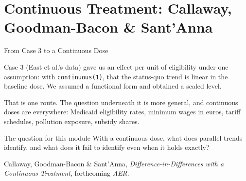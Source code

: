 \documentclass[main.tex]{subfiles}
\begin{document}
\section{Continuous Treatment: Callaway, Goodman-Bacon \& Sant'Anna}

\begin{frame}{From Case 3 to a Continuous Dose}

  Case 3 (East et al.'s data) gave us an effect per unit of eligibility under
  one assumption: with \texttt{continuous(1)}, that the status-quo trend is
  linear in the baseline dose. We assumed a functional form and obtained a
  scaled level.

  \medskip
  That is one route. The question underneath it is more general, and continuous
  doses are everywhere: Medicaid eligibility rates, minimum wages in euros,
  tariff schedules, pollution exposure, subsidy shares.

  \medskip
  \begin{block}{The question for this module}
    With a continuous dose, what does parallel trends identify, and what does it
    fail to identify even when it holds exactly?
  \end{block}

  \medskip
  \footnotesize Callaway, Goodman-Bacon \& Sant'Anna, \textit{Difference-in-Differences
  with a Continuous Treatment}, forthcoming \textit{AER}.

\end{frame}
\end{document}
